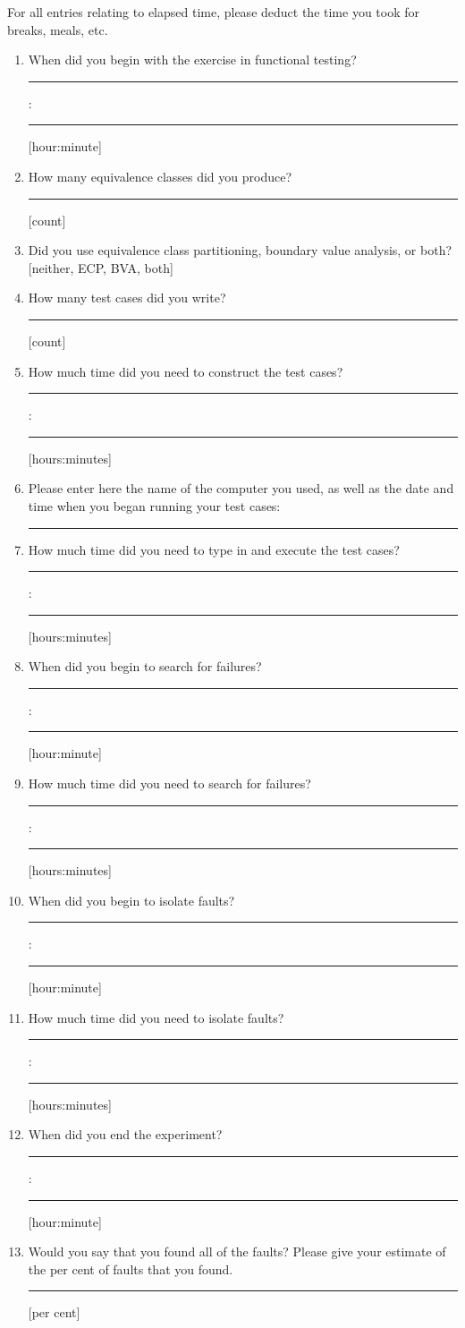 For all entries relating to elapsed time, please deduct the time you
took for breaks, meals, etc.

\begin{enumerate}
\addtocounter{enumi}{3}

\item When did you begin with the exercise in functional testing?
\rule{7mm}{.5pt} : \rule{7mm}{.5pt} [hour:minute]

\item How many equivalence classes did you produce?
\rule{7mm}{.5pt} [count]

\item Did you use equivalence class partitioning, boundary value
analysis, or both? [neither, ECP, BVA, both]

\item How many test cases did you write?
\rule{7mm}{.5pt} [count]

\item How much time did you need to construct the test cases?
\rule{7mm}{.5pt} : \rule{7mm}{.5pt} [hours:minutes]

\item Please enter here the name of the computer you used, as well as
the date and time when you began running your test cases:
\rule{6cm}{.5pt} 

\item How much time did you need to type in and execute the test cases?
\rule{7mm}{.5pt} : \rule{7mm}{.5pt} [hours:minutes]

\item When did you begin to search for failures?
\rule{7mm}{.5pt} : \rule{7mm}{.5pt} [hour:minute]

\item How much time did you need to search for failures?
\rule{7mm}{.5pt} : \rule{7mm}{.5pt} [hours:minutes]

\item When did you begin to isolate faults?
\rule{7mm}{.5pt} : \rule{7mm}{.5pt} [hour:minute]

\item How much time did you need to isolate faults?
\rule{7mm}{.5pt} : \rule{7mm}{.5pt} [hours:minutes]

\item When did you end the experiment?
\rule{7mm}{.5pt} : \rule{7mm}{.5pt} [hour:minute]

\item Would you say that you found all of the faults?
Please give your estimate of the per cent of faults that you found.
\rule{7mm}{.5pt} [per cent]


\end{enumerate}
